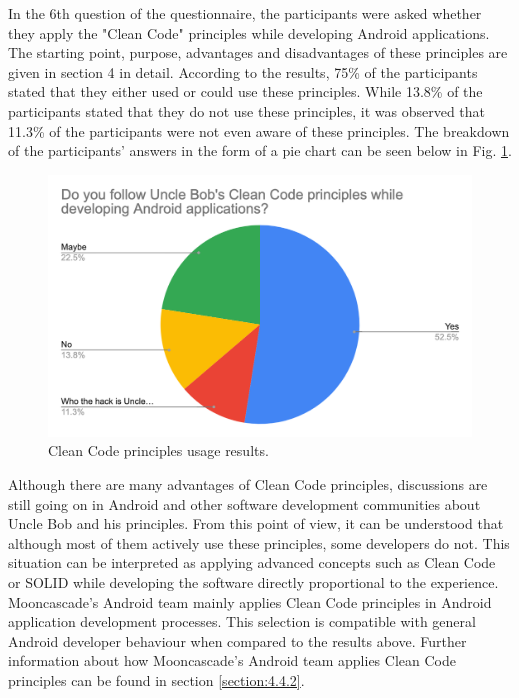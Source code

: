In the 6th question of the questionnaire, the participants were asked whether they apply the "Clean Code" principles while developing Android applications. The starting point, purpose, advantages and disadvantages of these principles are given in section 4 in detail. According to the results, 75\% of the participants stated that they either used or could use these principles. While 13.8\% of the participants stated that they do not use these principles, it was observed that 11.3\% of the participants were not even aware of these principles. The breakdown of the participants’ answers in the form of a pie chart can be seen below in Fig. \ref{fig:clean_code}.
\begin{figure}[ht!]
    \centering
    \includegraphics[scale=0.25]{figures/clean_code.png}
    \caption{Clean Code principles usage results.}
    \label{fig:clean_code}
\end{figure}
\FloatBarrier

Although there are many advantages of Clean Code principles, discussions are still going on in Android and other software development communities about Uncle Bob and his principles. From this point of view, it can be understood that although most of them actively use these principles, some developers do not. This situation can be interpreted as applying advanced concepts such as Clean Code or SOLID while developing the software directly proportional to the experience. Mooncascade's Android team mainly applies Clean Code principles in Android application development processes. This selection is compatible with general Android developer behaviour when compared to the results above. Further information about how Mooncascade's Android team applies Clean Code principles can be found in section \ref{section:4.4.2}.
